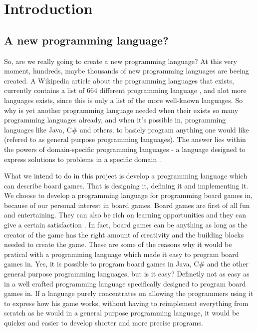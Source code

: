 \chapter{Introduction}
\label{chap:introduction}

\section{A new programming language?}
So, are we really going to create a new programming language? At this very moment, hundreds, maybe thousands of new programming languages are beeing created. A Wikipedia article about the programming languages that exists, currently contains a list of 664 different programming language \cite{listofprogramminglanguages}, and alot more languages exists, since this is only a list of the more well-known languages. So why is yet another programming language needed when their exists so many programming languages already, and when it's possible in, programming languages like Java, C\# and others, to basicly program anything one would like (refered to as general purpose programming languages). The answer lies within the powers of domain-specific programming languages - a language designed to express solutions to problems in a specific domain \cite{domainspecificprogramminglanguagedefinition}. 

What we intend to do in this project is develop a programming language which can describe board games. That is designing it, defining it and implementing it. We choose to develop a programming language for programming board games in, because of our personal interest in board games. Board games are first of all fun and entertaining. They can also be rich on learning opportunities \cite{whyboardgames1?} and they can give a certain satisfaction \cite{whyboardgames2?}. In fact, board games can be anything as long as the creator of the game has the right amount of creativity and the building blocks needed to create the game. These are some of the reasons why it would be pratical with a programming language which made it easy to program board games in. Yes, it is possible to program board games in Java, C\# and the other general purpose programming languages, but is it easy? Definetly not as easy as in a well crafted programming language specifically designed to program board games in. If a language purely concentrates on allowing the programmers using it to express how his game works, without having to reimplement everything from scratch as he would in a general purpose programming language, it would be quicker and easier to develop shorter and more precise programs.  


